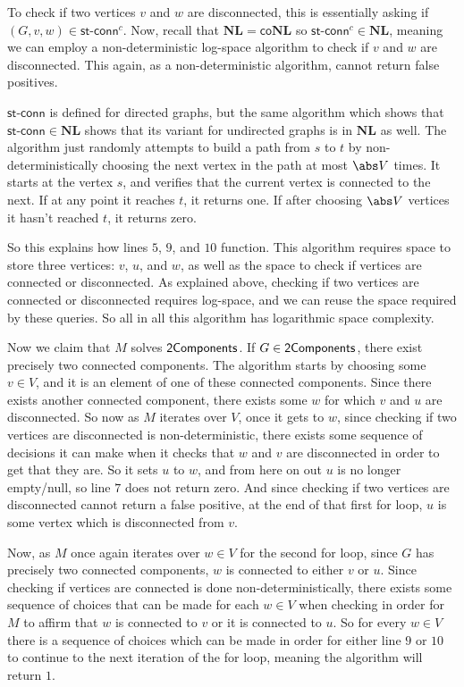 \documentclass[10pt]{article}
\def\stconn{\textsf{st-conn}}
\def\co{\mathsf{co}}
\def\NL{\mathbf{NL}}
\begin{document}
    \item To check if two vertices $v$ and $w$ are disconnected, this is essentially asking if $(G,v,w)\in\stconn^c$.
    Now, recall that $\NL=\co\NL$ so $\stconn^c\in\NL$, meaning we can employ a non-deterministic log-space algorithm to check if $v$ and $w$ are disconnected.
    This again, as a non-deterministic algorithm, cannot return false positives.
\eenum

\begin{note}

    $\stconn$ is defined for directed graphs, but the same algorithm which shows that $\stconn\in\NL$ shows that its variant for undirected graphs is in $\NL$ as well.
    The algorithm just randomly attempts to build a path from $s$ to $t$ by non-deterministically choosing the next vertex in the path at most $\abs V$ times.
    It starts at the vertex $s$, and verifies that the current vertex is connected to the next.
    If at any point it reaches $t$, it returns one.
    If after choosing $\abs V$ vertices it hasn't reached $t$, it returns zero.

\end{note}

So this explains how lines $5$, $9$, and $10$ function.
This algorithm requires space to store three vertices: $v$, $u$, and $w$, as well as the space to check if vertices are connected or disconnected.
As explained above, checking if two vertices are connected or disconnected requires log-space, and we can reuse the space required by these queries.
So all in all this algorithm has logarithmic space complexity.

Now we claim that $M$ solves $\mathsf{2Components}$.
If $G\in\mathsf{2Components}$, there exist precisely two connected components.
The algorithm starts by choosing some $v\in V$, and it is an element of one of these connected components.
Since there exists another connected component, there exists some $w$ for which $v$ and $u$ are disconnected.
So now as $M$ iterates over $V$, once it gets to $w$, since checking if two vertices are disconnected is non-deterministic, there exists some sequence of decisions it can make when it checks that
$w$ and $v$ are disconnected in order to get that they are.
So it sets $u$ to $w$, and from here on out $u$ is no longer empty/null, so line $7$ does not return zero.
And since checking if two vertices are disconnected cannot return a false positive, at the end of that first for loop, $u$ is some vertex which is disconnected from $v$.

Now, as $M$ once again iterates over $w\in V$ for the second for loop, since $G$ has precisely two connected components, $w$ is connected to either $v$ or $u$.
Since checking if vertices are connected is done non-deterministically, there exists some sequence of choices that can be made for each $w\in V$ when checking in order for $M$ to affirm that $w$ is connected
to $v$ or it is connected to $u$.
So for every $w\in V$ there is a sequence of choices which can be made in order for either line $9$ or $10$ to continue to the next iteration of the for loop, meaning the algorithm will return $1$.
\end{document}
